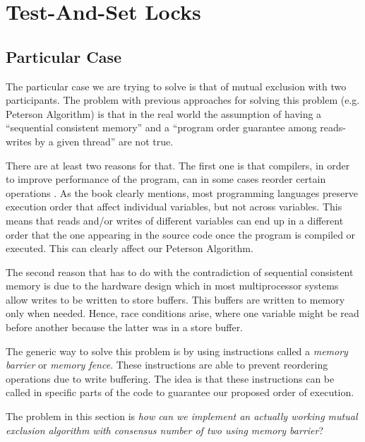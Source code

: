 \section{\textbf{Test-And-Set Locks}}
\subsection{Particular Case}
\par
The particular case we are trying to solve is that of mutual exclusion with two
participants. The problem with previous approaches for solving this problem
(e.g. Peterson Algorithm) is that in the real world the assumption of having a
``sequential consistent memory'' and a ``program order guarantee among
reads-writes by a given thread'' are not true.
\par
There are at least two reasons for that. The first one is that compilers, in
order to improve performance of the program, can in some cases reorder certain
operations . As the book clearly mentions, most programming languages preserve
execution order that affect individual variables, but not across variables. This
means that reads and/or writes of different variables can end up in a different
order that the one appearing in the source code once the program is compiled or
executed. This can clearly affect our Peterson Algorithm.
\par
The second reason that has to do with the contradiction of sequential consistent
memory is due to the hardware design which in most multiprocessor systems allow
writes to be written to store buffers. This buffers are written to memory only
when needed. Hence, race conditions arise, where one variable might be read
before another because the latter was in a store buffer.
\par
The generic way to solve this problem is by using instructions called a
\textit{memory barrier} or \textit{memory fence}. These instructions are able to
prevent reordering operations due to write buffering. The idea is that these
instructions can be called in specific parts of the code to guarantee our
proposed order of execution.
\par
The problem in this section is \textit{how can we implement an actually working
mutual exclusion algorithm with consensus number of two using memory barrier}?
\par
